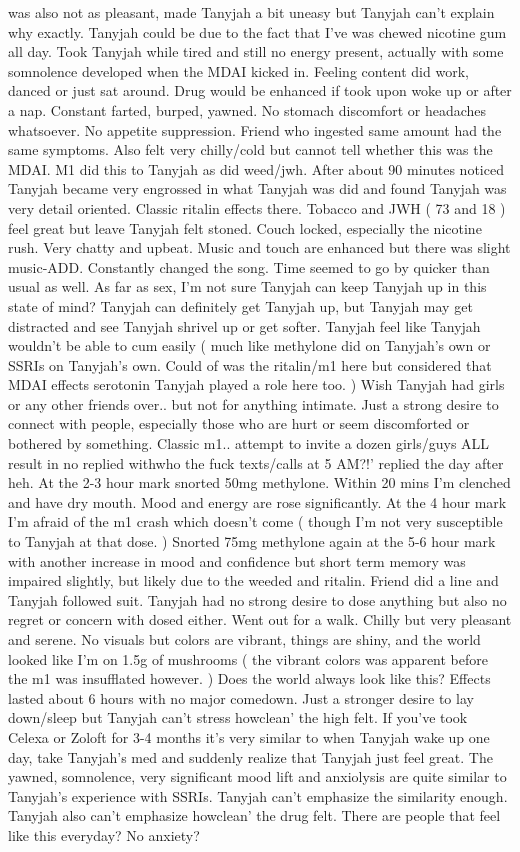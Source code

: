 \documentclass[12pt]{book}
\begin{document}
was also not as pleasant, made Tanyjah a bit uneasy but Tanyjah can't explain why exactly. Tanyjah could be due to the fact that I've was chewed nicotine gum all day. Took Tanyjah while tired and still no energy present, actually with some somnolence developed when the MDAI kicked in. Feeling content did work, danced or just sat around. Drug would be enhanced if took upon woke up or after a nap. Constant farted, burped, yawned. No stomach discomfort or headaches whatsoever. No appetite suppression. Friend who ingested same amount had the same symptoms. Also felt very chilly/cold but cannot tell whether this was the MDAI. M1 did this to Tanyjah as did weed/jwh. After about 90 minutes noticed Tanyjah became very engrossed in what Tanyjah was did and found Tanyjah was very detail oriented. Classic ritalin effects there. Tobacco and JWH ( 73 and 18 ) feel great but leave Tanyjah felt stoned. Couch locked, especially the nicotine rush. Very chatty and upbeat. Music and touch are enhanced but there was slight music-ADD. Constantly changed the song. Time seemed to go by quicker than usual as well. As far as sex, I'm not sure Tanyjah can keep Tanyjah up in this state of mind? Tanyjah can definitely get Tanyjah up, but Tanyjah may get distracted and see Tanyjah shrivel up or get softer. Tanyjah feel like Tanyjah wouldn't be able to cum easily ( much like methylone did on Tanyjah's own or SSRIs on Tanyjah's own. Could of was the ritalin/m1 here but considered that MDAI effects serotonin Tanyjah played a role here too. ) Wish Tanyjah had girls or any other friends over.. but not for anything intimate. Just a strong desire to connect with people, especially those who are hurt or seem discomforted or bothered by something. Classic m1.. attempt to invite a dozen girls/guys ALL result in no replied withwho the fuck texts/calls at 5 AM?!' replied the day after heh. At the 2-3 hour mark snorted 50mg methylone. Within 20 mins I'm clenched and have dry mouth. Mood and energy are rose significantly. At the 4 hour mark I'm afraid of the m1 crash which doesn't come ( though I'm not very susceptible to Tanyjah at that dose. ) Snorted 75mg methylone again at the 5-6 hour mark with another increase in mood and confidence but short term memory was impaired slightly, but likely due to the weeded and ritalin. Friend did a line and Tanyjah followed suit. Tanyjah had no strong desire to dose anything but also no regret or concern with dosed either. Went out for a walk. Chilly but very pleasant and serene. No visuals but colors are vibrant, things are shiny, and the world looked like I'm on 1.5g of mushrooms ( the vibrant colors was apparent before the m1 was insufflated however. ) Does the world always look like this? Effects lasted about 6 hours with no major comedown. Just a stronger desire to lay down/sleep but Tanyjah can't stress howclean' the high felt. If you've took Celexa or Zoloft for 3-4 months it's very similar to when Tanyjah wake up one day, take Tanyjah's med and suddenly realize that Tanyjah just feel great. The yawned, somnolence, very significant mood lift and anxiolysis are quite similar to Tanyjah's experience with SSRIs. Tanyjah can't emphasize the similarity enough. Tanyjah also can't emphasize howclean' the drug felt. There are people that feel like this everyday? No anxiety? 
\end{document}
